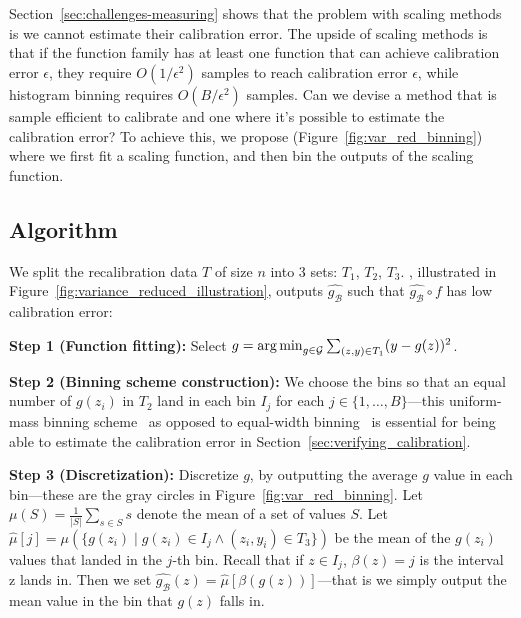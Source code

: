 \section{\Ourcal{}}
\label{sec:calibrating_models}

Section~\ref{sec:challenges-measuring} shows that the problem with scaling methods is we cannot estimate their calibration error. The upside of scaling methods is that if the function family has at least one function that can achieve calibration error $\epsilon$, they require $O(1/\epsilon^2)$ samples to reach calibration error $\epsilon$, while histogram binning requires $O(B/\epsilon^2)$ samples. Can we devise a method that is sample efficient to calibrate and one where it's possible to estimate the calibration error?
To achieve this, we propose \ourcal{} (Figure~\ref{fig:var_red_binning}) where we first fit a scaling function, and then bin the outputs of the scaling function.

\subsection{Algorithm}

We split the recalibration data $T$ of size $n$ into 3 sets: $T_1$, $T_2$, $T_3$. \Ourcal{}, illustrated in Figure~\ref{fig:variance_reduced_illustration}, outputs $\hat{g_{\mathcal{B}}}$ such that $\hat{g_{\mathcal{B}}} \circ f$ has low calibration error:

\textbf{Step 1 (Function fitting):} Select $g = \operatorname*{arg\,min}_{g \in \mathcal{G}} \sum_{(z, y) \in T_1} (y - g(z))^2$.

\textbf{Step 2 (Binning scheme construction):} We choose the bins so that an equal number of $g(z_i)$ in $T_2$ land in each bin $I_j$ for each $j \in \{1, \dots, B\}$---this uniform-mass binning scheme~\cite{zadrozny2001calibrated} as opposed to equal-width binning~\cite{guo2017calibration} is essential for being able to estimate the calibration error in Section~\ref{sec:verifying_calibration}.

\textbf{Step 3 (Discretization):} Discretize $g$, by outputting the average $g$ value in each bin---these are the gray circles in Figure~\ref{fig:var_red_binning}. Let $\mu(S) = \frac{1}{|S|} \sum_{s \in S} s$ denote the mean of a set of values $S$.
Let $\hat{\mu}[j] = \mu(\{ g(z_i) \; | \; g(z_i) \in I_j \wedge (z_i, y_i) \in T_3 \})$ be the mean of the $g(z_i)$ values that landed in the $j$-th bin.
Recall that if $z \in I_j$,  $\beta(z) = j$ is the interval z lands in.
Then we set $\hat{g_{\mathcal{B}}}(z) = \hat{\mu}[\beta(g(z))]$---that is we simply output the mean value in the bin that $g(z)$ falls in.

